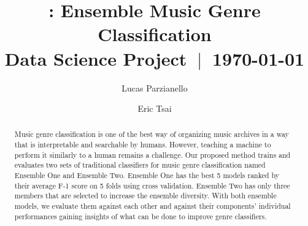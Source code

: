 \title[\name -- Ensemble Music Genre Classification]{\name: Ensemble Music Genre Classification\\{\sc\small Data Science Project $~|~$ \today}}

\setreviewson


\author{Lucas Parzianello}


\author{Eric Tsai}

\renewcommand{\shortauthors}{Parzianello and Tsai}

\begin{abstract}
Music genre classification is one of the best way of organizing music archives in a way that is interpretable and searchable by humans. However, teaching a machine to perform it similarly to a human remains a challenge. Our proposed method trains and evaluates two sets of traditional classifiers for music genre classification named Ensemble One and Ensemble Two. Ensemble One has the best 5 models ranked by their average F-1 score on 5 folds using cross validation. Ensemble Two has only three members that are selected to increase the ensemble diversity. With both ensemble models, we evaluate them against each other and against their components' individual performances gaining insights of what can be done to improve genre classifiers.
\end{abstract}

